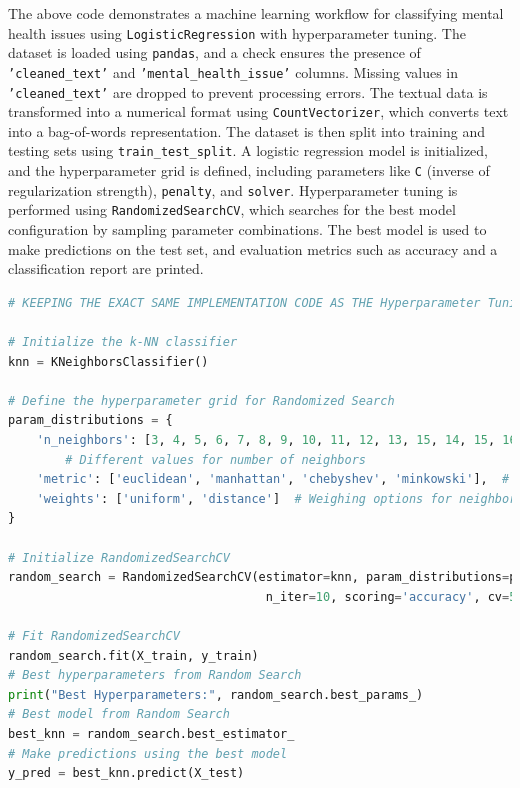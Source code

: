 \noindent
The above code demonstrates a machine learning workflow for classifying mental health issues using \texttt{LogisticRegression} with hyperparameter tuning. The dataset is loaded using \texttt{pandas}, and a check ensures the presence of \texttt{'cleaned\_text'} and \texttt{'mental\_health\_issue'} columns. Missing values in \texttt{'cleaned\_text'} are dropped to prevent processing errors. The textual data is transformed into a numerical format using \texttt{CountVectorizer}, which converts text into a bag-of-words representation. The dataset is then split into training and testing sets using \texttt{train\_test\_split}. A logistic regression model is initialized, and the hyperparameter grid is defined, including parameters like \texttt{C} (inverse of regularization strength), \texttt{penalty}, and \texttt{solver}. Hyperparameter tuning is performed using \texttt{RandomizedSearchCV}, which searches for the best model configuration by sampling parameter combinations. The best model is used to make predictions on the test set, and evaluation metrics such as accuracy and a classification report are printed.


\begin{tcolorbox}[colback=gray!5!white, colframe=gray!80!black, boxrule=0.5pt, title=K Nearest Neighbours]
    \begin{lstlisting}[language=Python]
# KEEPING THE EXACT SAME IMPLEMENTATION CODE AS THE Hyperparameter Tuning ON LOGISTIC REGRESSION

# Initialize the k-NN classifier
knn = KNeighborsClassifier()

# Define the hyperparameter grid for Randomized Search
param_distributions = {
    'n_neighbors': [3, 4, 5, 6, 7, 8, 9, 10, 11, 12, 13, 15, 14, 15, 16, 17, 18, 19, 20],
        # Different values for number of neighbors
    'metric': ['euclidean', 'manhattan', 'chebyshev', 'minkowski'],  # Different distance metrics
    'weights': ['uniform', 'distance']  # Weighing options for neighbors
}

# Initialize RandomizedSearchCV
random_search = RandomizedSearchCV(estimator=knn, param_distributions=param_distributions,
                                    n_iter=10, scoring='accuracy', cv=5, n_jobs=-1, random_state=42)

# Fit RandomizedSearchCV
random_search.fit(X_train, y_train)
# Best hyperparameters from Random Search
print("Best Hyperparameters:", random_search.best_params_)
# Best model from Random Search
best_knn = random_search.best_estimator_
# Make predictions using the best model
y_pred = best_knn.predict(X_test)
\end{lstlisting}
\end{tcolorbox}

